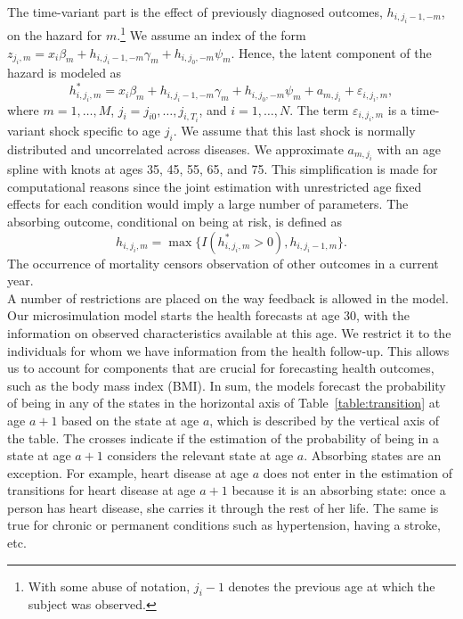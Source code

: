 \noindent The time-variant part is the effect of previously diagnosed outcomes, $h_{i,j_i-1,-m}$,
on the hazard for $m$.\footnote{With some abuse of notation, $j_i-1$ denotes
the previous age at which the subject was observed.} We assume an index of
the form $z_{j_i,m} = x_i\beta_m + h_{i,j_i-1,-m} \gamma_m + h_{i,j_0,-m}\psi_m$. Hence, the
latent component of the hazard is modeled as
\begin{equation}
h^*_{i,j_i,m}= x_i\beta_m + h_{i,j_i-1,-m} \gamma_m + h_{i,j_0,-m}\psi_m + a_{m,j_i} + \varepsilon_{i,j_i,m},
\label{eqn:transition_hzd_latent}
\end{equation}
where $m = 1,\ldots,M$, $j_i = j_{i0},\ldots,j_{i,T_i}$, and $i=1,\ldots,N$.
The term $\varepsilon_{i,j_i,m}$ is a time-variant shock specific to age $j_i$.
We assume that this last shock is normally distributed and uncorrelated across
diseases. We approximate $a_{m,j_i}$ with an age spline with knots at ages 35, 45,
55, 65, and 75.
This simplification is made
for computational reasons since the joint estimation with unrestricted age fixed
effects for each condition would imply a large number of parameters. The
absorbing outcome, conditional on being at risk, is defined as
\begin{equation*}
h_{i,j_i,m} = \max\{I(h^*_{i,j_i,m} > 0), h_{i,j_i-1,m}\}.
\end{equation*}
The occurrence of mortality censors observation of other
outcomes in a current year. \\

\noindent A number of restrictions are placed on the way feedback is allowed in the model. Our microsimulation model starts the health forecasts at age 30, with the information on observed characteristics available at this age. We restrict it to the individuals for whom we have information from the health follow-up. This allows us to account for components that are crucial for forecasting health outcomes, such as the body mass index (BMI). In sum, the models forecast the probability of being in any of the states in the horizontal axis of Table~\ref{table:transition} at age $a+1$ based on the state at age $a$, which is described by the vertical axis of the table. The crosses indicate if the estimation of the probability of being in a state at age $a+1$ considers the relevant state at age $a$. Absorbing states are an exception. For example, heart disease at age $a$ does not enter in the estimation of transitions for heart disease at age $a+1$ because it is an absorbing state: once a person has heart disease, she carries it through the rest of her life. The same is true for chronic or permanent conditions such as hypertension, having a stroke, etc. \\

